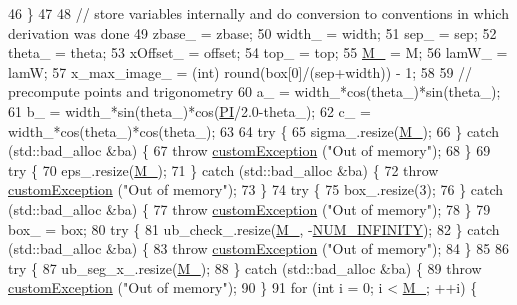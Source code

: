 \begin{DoxyCode}
46     \}
47 
48     \textcolor{comment}{// store variables internally and do conversion to conventions in which derivation was done}
49     zbase\_ = zbase;
50     width\_ = width;
51     sep\_ = sep;
52     theta\_ = theta;
53     xOffset\_ = offset;
54     top\_ = top;
55     \hyperlink{classbarrier_a274cf283ffc97c22ffa9a4258369c400}{M\_} = M;
56     lamW\_ = lamW;
57     x\_max\_image\_ = (int) round(box[0]/(sep+width)) - 1;
58 
59     \textcolor{comment}{// precompute points and trigonometry}
60     a\_ = width\_*cos(theta\_)*sin(theta\_);
61     b\_ = width\_*sin(theta\_)*cos(\hyperlink{global_8h_a598a3330b3c21701223ee0ca14316eca}{PI}/2.0-theta\_);
62     c\_ = width\_*cos(theta\_)*cos(theta\_);
63 
64     \textcolor{keywordflow}{try} \{
65         sigma\_.resize(\hyperlink{classbarrier_a274cf283ffc97c22ffa9a4258369c400}{M\_});
66     \} \textcolor{keywordflow}{catch} (std::bad\_alloc &ba) \{
67         \textcolor{keywordflow}{throw} \hyperlink{classcustom_exception}{customException} (\textcolor{stringliteral}{"Out of memory"});
68     \}
69     \textcolor{keywordflow}{try} \{
70         eps\_.resize(\hyperlink{classbarrier_a274cf283ffc97c22ffa9a4258369c400}{M\_});
71     \} \textcolor{keywordflow}{catch} (std::bad\_alloc &ba) \{
72         \textcolor{keywordflow}{throw} \hyperlink{classcustom_exception}{customException} (\textcolor{stringliteral}{"Out of memory"});
73     \}
74     \textcolor{keywordflow}{try} \{
75         box\_.resize(3);
76     \} \textcolor{keywordflow}{catch} (std::bad\_alloc &ba) \{
77         \textcolor{keywordflow}{throw} \hyperlink{classcustom_exception}{customException} (\textcolor{stringliteral}{"Out of memory"});
78     \}
79     box\_ = box;
80     \textcolor{keywordflow}{try} \{
81         ub\_check\_.resize(\hyperlink{classbarrier_a274cf283ffc97c22ffa9a4258369c400}{M\_}, -\hyperlink{potentials_8h_ab94ab1d09e2291d03fe92a0e24a9d33b}{NUM\_INFINITY});
82     \} \textcolor{keywordflow}{catch} (std::bad\_alloc &ba) \{
83         \textcolor{keywordflow}{throw} \hyperlink{classcustom_exception}{customException} (\textcolor{stringliteral}{"Out of memory"});
84     \}
85 
86     \textcolor{keywordflow}{try} \{
87         ub\_seg\_x\_.resize(\hyperlink{classbarrier_a274cf283ffc97c22ffa9a4258369c400}{M\_});
88     \} \textcolor{keywordflow}{catch} (std::bad\_alloc &ba) \{
89         \textcolor{keywordflow}{throw} \hyperlink{classcustom_exception}{customException} (\textcolor{stringliteral}{"Out of memory"});
90     \}
91     \textcolor{keywordflow}{for} (\textcolor{keywordtype}{int} i = 0; i < \hyperlink{classbarrier_a274cf283ffc97c22ffa9a4258369c400}{M\_}; ++i) \{

\end{DoxyCode}
